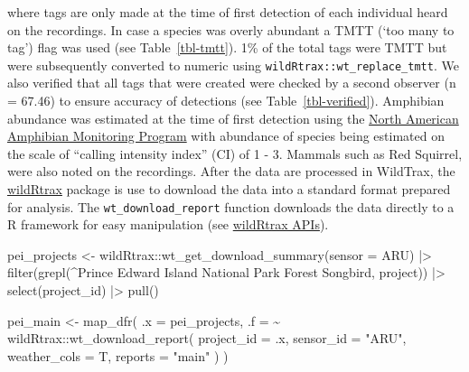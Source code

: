 \documentclass[
  letterpaper,
  DIV=11,
  numbers=noendperiod,
  oneside]{scrartcl}
\newenvironment{Shaded}{\begin{snugshade}}{\end{snugshade}}
\newcommand{\AttributeTok}[1]{\textcolor[rgb]{0.40,0.45,0.13}{#1}}
\newcommand{\FunctionTok}[1]{\textcolor[rgb]{0.28,0.35,0.67}{#1}}
\newcommand{\NormalTok}[1]{\textcolor[rgb]{0.00,0.23,0.31}{#1}}
\newcommand{\OtherTok}[1]{\textcolor[rgb]{0.00,0.23,0.31}{#1}}
\newcommand{\SpecialCharTok}[1]{\textcolor[rgb]{0.37,0.37,0.37}{#1}}
\newcommand{\StringTok}[1]{\textcolor[rgb]{0.13,0.47,0.30}{#1}}
\begin{document}
where tags are only made at the time of first detection of each
individual heard on the recordings. In case a species was overly
abundant a TMTT (`too many to tag') flag was used (see
Table~\ref{tbl-tmtt}). 1\% of the total tags were TMTT but were
subsequently converted to numeric using
\texttt{wildRtrax::wt\_replace\_tmtt}. We also verified that all tags
that were created were checked by a second observer (n = 67.46) to
ensure accuracy of detections (see Table~\ref{tbl-verified}). Amphibian
abundance was estimated at the time of first detection using the
\href{https://www.usgs.gov/centers/eesc/science/north-american-amphibian-monitoring-program}{North
American Amphibian Monitoring Program} with abundance of species being
estimated on the scale of ``calling intensity index'' (CI) of 1 - 3.
Mammals such as Red Squirrel, were also noted on the recordings. After
the data are processed in WildTrax, the
\href{https://abbiodiversity.github.io/wildRtrax/}{wildRtrax} package is
use to download the data into a standard format prepared for analysis.
The \texttt{wt\_download\_report} function downloads the data directly
to a R framework for easy manipulation (see
\href{https://abbiodiversity.github.io/wildRtrax/articles/apis.html}{wildRtrax
APIs}).

\begin{Shaded}
\begin{Highlighting}[]
\NormalTok{pei\_projects }\OtherTok{\textless{}{-}}\NormalTok{ wildRtrax}\SpecialCharTok{::}\FunctionTok{wt\_get\_download\_summary}\NormalTok{(}\AttributeTok{sensor =} \StringTok{\textquotesingle{}ARU\textquotesingle{}}\NormalTok{) }\SpecialCharTok{|\textgreater{}}
  \FunctionTok{filter}\NormalTok{(}\FunctionTok{grepl}\NormalTok{(}\StringTok{\textquotesingle{}\^{}Prince Edward Island National Park Forest Songbird\textquotesingle{}}\NormalTok{, project)) }\SpecialCharTok{|\textgreater{}}
  \FunctionTok{select}\NormalTok{(project\_id) }\SpecialCharTok{|\textgreater{}}
  \FunctionTok{pull}\NormalTok{()}

\NormalTok{pei\_main }\OtherTok{\textless{}{-}}
  \FunctionTok{map\_dfr}\NormalTok{(}
    \AttributeTok{.x =}\NormalTok{ pei\_projects,}
    \AttributeTok{.f =} \SpecialCharTok{\textasciitilde{}}\NormalTok{ wildRtrax}\SpecialCharTok{::}\FunctionTok{wt\_download\_report}\NormalTok{(}
      \AttributeTok{project\_id =}\NormalTok{ .x,}
      \AttributeTok{sensor\_id =} \StringTok{"ARU"}\NormalTok{,}
      \AttributeTok{weather\_cols =}\NormalTok{ T,}
      \AttributeTok{reports =} \StringTok{"main"}
\NormalTok{    )}
\NormalTok{  )}
\end{Highlighting}
\end{Shaded}
\end{document}
